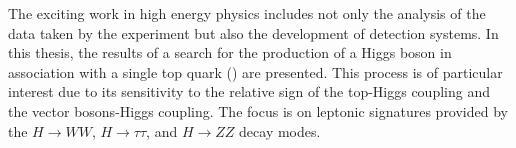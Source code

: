 \footnotesize
The exciting work in high energy physics includes not only the analysis of the data taken by the experiment but also the development of detection systems. In this thesis, the results of a search for the production of a Higgs boson in association with a single top quark (\tH) are presented. This process is of particular interest due to its sensitivity to the relative sign of the top-Higgs coupling and the vector bosons-Higgs coupling. The focus is on leptonic signatures provided by the $H \to WW$, $H \to \tau\tau$, and $H \to ZZ$ decay modes. 





